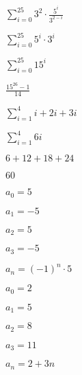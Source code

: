 \documentclass{exam}
\begin{document}
\begin{questions}
\begin{subparts}

\begin{center}

\( \sum_{i=0}^{25} 3^2 \cdot \frac{{5^{i}}}{3^{2-i}} \)

\( \sum_{i=0}^{25} 5^{i} \cdot 3^{i} \)

\( \sum_{i=0}^{25} {15}^{i} \)

\( \frac{15^{26}-1}{14} \)

\end{center}


\begin{center}

\( \sum_{i=1}^{4} i + 2i + 3i \)

\( \sum_{i=1}^{4} 6i \)

\( 6 + 12 + 18 + 24 \)

\( 60 \)

\end{center}

\end{subparts}

\begin{subparts}

\begin{center}

\(a_0 = 5\)

\(a_1 = -5\)

\(a_2 = 5\)

\(a_3 = -5\)

\(a_n = (-1)^n \cdot 5\)

\end{center}


\begin{center}

\(a_0 = 2\)

\(a_1 = 5\)

\(a_2 = 8\)

\(a_3 = 11\)

\(a_n = 2 + 3n\)

\end{center}



\end{subparts}
\end{questions}
\end{document}
